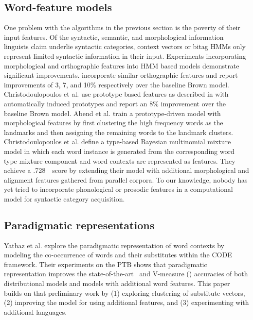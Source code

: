\subsection{Word-feature models}
One problem with the algorithms in the previous section is the poverty
of their input features.  Of the syntactic, semantic, and
morphological information linguists claim underlie syntactic
categories, context vectors or bitag HMMs only represent limited
syntactic information in their input.  Experiments incorporating
morphological and orthographic features into HMM based models
demonstrate significant improvements.
\cite{Clark:2003:CDM:1067807.1067817,bergkirkpatrick-klein:2010:ACL,blunsom-cohn:2011:ACL-HLT2011}
incorporate similar orthographic features and report improvements of
3, 7, and 10\% respectively over the baseline Brown model.
Christodoulopoulos et
al.  use
prototype based features as described in
\cite{Haghighi:2006:PLS:1220835.1220876} with automatically induced
prototypes and report an 8\% improvement over the baseline Brown
model.  Abend et al.  train
a prototype-driven model with morphological features by first
clustering the high frequency words as the landmarks and then
assigning the remaining words to the landmark clusters.
Christodoulopoulos et
al. 
define a type-based Bayesian multinomial mixture model in which each
word instance is generated from the corresponding word type mixture
component and word contexts are represented as features.  They achieve
a .728\ \mto\ score by extending their model with additional
morphological and alignment features gathered from parallel corpora.
To our knowledge, nobody has yet tried to incorporate phonological or
prosodic features in a computational model for syntactic category
acquisition.

\subsection{Paradigmatic representations}

Yatbaz et al.  explore
the paradigmatic representation of word contexts by modeling the
co-occurrence of words and their substitutes within the CODE
framework.  Their experiments on the PTB shows that paradigmatic
representation improves the state-of-the-art \mto\ and V-measure (\vm)
accuracies of both distributional models and models with additional
word features.  This paper builds on that preliminary work by (1)
exploring clustering of substitute vectors, (2) improving the model
for using additional features, and (3) experimenting with additional
languages.

